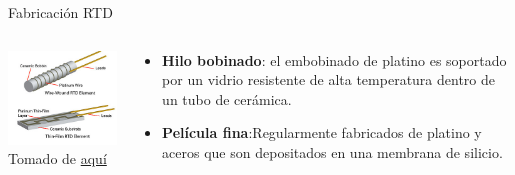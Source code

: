\documentclass[aspectratio=169]{beamer}
\begin{document}
\begin{frame}{Fabricación RTD}
    \begin{columns}[c, onlytextwidth]
        \begin{column}{0.45\textwidth}
        \includegraphics[width=6.5cm]{fig/rtd_types.jpg}
            \\ \tiny{Tomado de \href{https://www.designworldonline.com/designing-with-rtd-temperature-sensors/}{aquí}}
            
        \end{column}
        \begin{column}{0.55\textwidth}
            \begin{itemize}
                \item \textbf{Hilo bobinado}: el embobinado de platino es soportado por un vidrio resistente de alta temperatura dentro de un tubo de cerámica.     
                \item \textbf{Película fina}:Regularmente fabricados de platino y aceros que son depositados en una membrana de silicio.
            \end{itemize}
        \end{column}
    \end{columns}
\end{frame}
\end{document}

